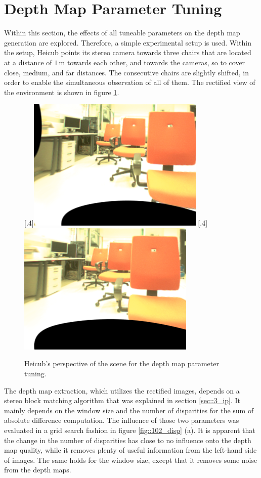 \FloatBarrier
\section{Depth Map Parameter Tuning}
\label{sec::102_dp}
Within this section, the effects of all tuneable parameters on the depth map generation are explored. Therefore, a simple experimental setup is used. Within the setup, Heicub points its stereo camera towards three chairs that are located at a distance of $1\,\text{m}$ towards each other, and towards the cameras, so to cover close, medium, and far distances. The consecutive chairs are slightly shifted, in order to enable the simultaneous observation of all of them. The rectified view of the environment is shown in figure \ref{fig::102_wls_rgb}.
\begin{figure}[h!]
	\centering
	[.4\linewidth]{\includegraphics[scale=.3]{chapters/10_image_processing_experiments/img/l_rgb.png}}
	[.4\linewidth]{\includegraphics[scale=.3]{chapters/10_image_processing_experiments/img/r_rgb.png}}
	\caption{Heicub's perspective of the scene for the depth map parameter tuning.}
	\label{fig::102_wls_rgb}
\end{figure}
The depth map extraction, which utilizes the rectified images, depends on a stereo block matching algorithm that was explained in section \ref{sec::3_ip}. It mainly depends on the window size and the number of disparities for the sum of absolute difference computation. The influence of those two parameters was evaluated in a grid search fashion in figure \ref{fig::102_disp} (a). It is apparent that the change in the number of disparities has close to no influence onto the depth map quality, while it removes plenty of useful information from the left-hand side of images. The same holds for the window size, except that it removes some noise from the depth maps.
